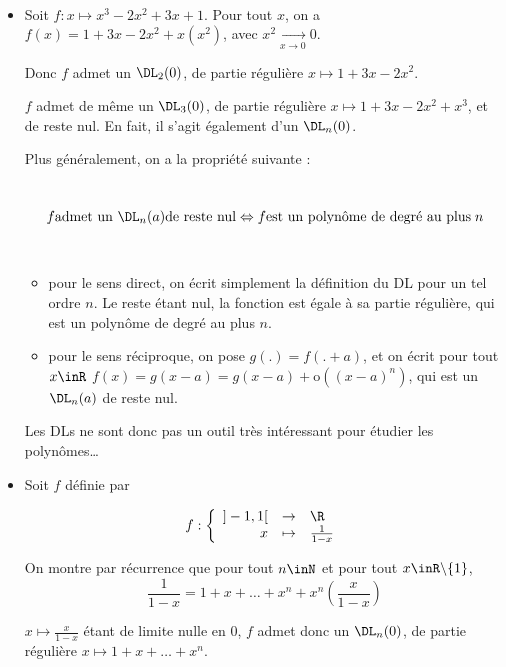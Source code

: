 \documentclass[12pt]{article}
\begin{document}
\begin{Exems}~
  \begin{itemize}

  \item Soit $f:x\mapsto x^3-2x^2+3x+1$. Pour tout $x$, on a $f(x)=1+3x-2x^2+x (x^2)$, avec $x^2
    \underset{x\rightarrow 0}{\rightarrow} 0 $.

    Donc $f$ admet un $\DL_2(0)$, de partie régulière $x\mapsto 1+3x-2x^2$.
    
    $f$ admet de même un  $\DL_3(0)$, de partie régulière $x\mapsto 1+3x-2x^2+x^3$,
    et de reste nul. En fait, il s'agit également d'un $\DL_n(0)$.
    
    Plus généralement, on a la propriété suivante :
    
    \begin{Prop}~      
      $$ f \text{admet un } \DL_n(a) \text{de reste nul}
      \Leftrightarrow f \text{est un polynôme de degré au plus\;} n $$
    \end{Prop}
    \begin{demo}~
      
      
      \begin{itemize}
        \item pour le sens direct, on écrit simplement la définition du DL
        pour un tel ordre $n$. Le reste étant nul, la fonction est égale à
        sa partie régulière, qui est un polynôme de degré au plus $n$.
        
        \item pour le sens réciproque, on pose $g(.)=f(.+a)$, et on écrit
        pour tout $x\inR$ $f(x)=g(x-a)=g(x-a)+\text{o}((x-a)^n)$, qui est un $\DL_n(a)$ de reste
        nul.
      \end{itemize}


    \end{demo}

    Les DLs ne sont donc pas un outil très intéressant pour étudier les
    polynômes\dots
    
  \item Soit $f$ définie par

\[
f : \left\{
\begin{array}{rcl}
]-1,1[ & \to & \R \\
x & \mapsto & \frac{1}{1-x}
\end{array}
\right.
\]

On montre par récurrence que pour tout $n \inN$ et pour tout $x\inR\backslash\{1\}$, $$\frac{1}{1-x} = 1 + x +
\dots + x^n + x^n \left(\frac{x}{1-x}\right)$$

$x\mapsto \frac{x}{1-x}$ étant de limite nulle en $0$, $f$ admet donc un
$\DL_n(0)$, de partie régulière $ x\mapsto 1 + x + \dots + x^n$.

  \end{itemize}
\end{Exems}
\end{document}
